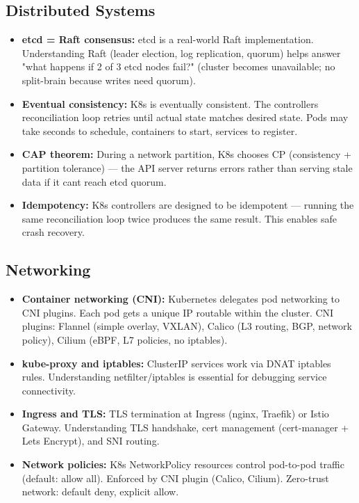 \documentclass[11pt]{article}
\providecommand{\tightlist}{\setlength{\itemsep}{1pt}\setlength{\parskip}{0pt}}
\begin{document}
\subsection{Distributed Systems}\label{distributed-systems}

\begin{itemize}
\tightlist
\item
  \textbf{etcd = Raft consensus:} etcd is a real-world Raft implementation. Understanding Raft (leader election, log replication, quorum) helps answer "what happens if 2 of 3 etcd nodes fail?" (cluster becomes unavailable; no split-brain because writes need quorum).
\item
  \textbf{Eventual consistency:} K8s is eventually consistent. The controller\textquotesingle s reconciliation loop retries until actual state matches desired state. Pods may take seconds to schedule, containers to start, services to register.
\item
  \textbf{CAP theorem:} During a network partition, K8s chooses CP (consistency + partition tolerance) --- the API server returns errors rather than serving stale data if it can\textquotesingle t reach etcd quorum.
\item
  \textbf{Idempotency:} K8s controllers are designed to be idempotent --- running the same reconciliation loop twice produces the same result. This enables safe crash recovery.
\end{itemize}

\subsection{Networking}\label{networking}

\begin{itemize}
\tightlist
\item
  \textbf{Container networking (CNI):} Kubernetes delegates pod networking to CNI plugins. Each pod gets a unique IP routable within the cluster. CNI plugins: Flannel (simple overlay, VXLAN), Calico (L3 routing, BGP, network policy), Cilium (eBPF, L7 policies, no iptables).
\item
  \textbf{kube-proxy and iptables:} ClusterIP services work via DNAT iptables rules. Understanding netfilter/iptables is essential for debugging service connectivity.
\item
  \textbf{Ingress and TLS:} TLS termination at Ingress (nginx, Traefik) or Istio Gateway. Understanding TLS handshake, cert management (cert-manager + Let\textquotesingle s Encrypt), and SNI routing.
\item
  \textbf{Network policies:} K8s NetworkPolicy resources control pod-to-pod traffic (default: allow all). Enforced by CNI plugin (Calico, Cilium). Zero-trust network: default deny, explicit allow.
\end{itemize}
\end{document}
